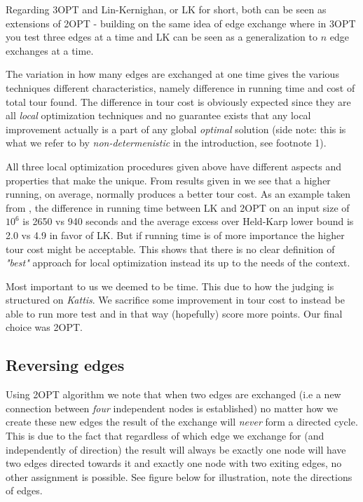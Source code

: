 \documentclass[a4paper,12pt,oneside]{article}
\begin{document}
Regarding 3OPT and Lin-Kernighan, or LK for short, both can be seen as extensions of 2OPT - building on the same idea of edge exchange where in 3OPT you test three edges at a time and LK can be seen as a generalization to $n$ edge exchanges at a time.

The variation in how many edges are exchanged at one time gives the various techniques different characteristics, namely difference in running time and cost of total tour found. The difference in tour cost is obviously expected since they are all \textit{local} optimization techniques and no guarantee exists that any local improvement actually is a part of any global \textit{optimal} solution (side note: this is what we refer to by \textit{non-determenistic} in the introduction, see footnote 1).

All three local optimization procedures given above have different aspects and properties that make the unique. From results given in \cite{localopt} we see that a higher running, on average, normally produces a better tour cost. As an example taken from \cite{localopt}, the difference in running time between LK and 2OPT on an input size of $10^6$ is 2650 vs 940 seconds and the average excess over Held-Karp lower bound is 2.0 vs 4.9 in favor of LK. But if running time is of more importance the higher tour cost might be acceptable. This shows that there is no clear definition of \textit{"best"} approach for local optimization instead its up to the needs of the context. 

Most important to us we deemed to be time. This due to how the judging is structured on \textit{Kattis}. We sacrifice some improvement in tour cost to instead be able to run more test and in that way (hopefully) score more points. Our final choice was 2OPT.

\subsection{Reversing edges}
Using 2OPT algorithm we note that when two edges are exchanged (i.e a new connection between \textit{four} independent nodes is established) no matter how we create these new edges the result of the exchange will \textit{never} form a directed cycle. This is due to the fact that regardless of which edge we exchange for (and independently of direction) the result will always be exactly one node will have two edges directed towards it and exactly one node with two exiting edges, no other assignment is possible. See figure below for illustration, note the directions of edges.
\end{document}
